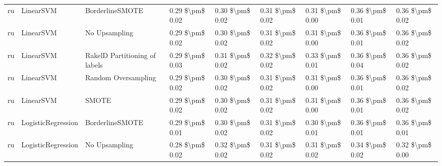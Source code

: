 \begin{tabular}{lllllllll}
      ru &                       LinearSVM &               BorderlineSMOTE & 0.29 \$\textbackslash pm\$ 0.02 &           0.30 \$\textbackslash pm\$ 0.02 &       0.31 \$\textbackslash pm\$ 0.02 &        0.31 \$\textbackslash pm\$ 0.00 &                         0.36 \$\textbackslash pm\$ 0.01 &     0.36 \$\textbackslash pm\$ 0.02 \\
      ru &                       LinearSVM &                 No Upsampling & 0.29 \$\textbackslash pm\$ 0.02 &           0.30 \$\textbackslash pm\$ 0.02 &       0.31 \$\textbackslash pm\$ 0.02 &        0.31 \$\textbackslash pm\$ 0.00 &                         0.36 \$\textbackslash pm\$ 0.01 &     0.36 \$\textbackslash pm\$ 0.02 \\
      ru &                       LinearSVM & RakelD Partitioning of labels & 0.29 \$\textbackslash pm\$ 0.03 &           0.31 \$\textbackslash pm\$ 0.02 &       0.32 \$\textbackslash pm\$ 0.02 &        0.33 \$\textbackslash pm\$ 0.01 &                         0.36 \$\textbackslash pm\$ 0.04 &     0.36 \$\textbackslash pm\$ 0.02 \\
      ru &                       LinearSVM &           Random Oversampling & 0.29 \$\textbackslash pm\$ 0.02 &           0.30 \$\textbackslash pm\$ 0.02 &       0.31 \$\textbackslash pm\$ 0.02 &        0.31 \$\textbackslash pm\$ 0.00 &                         0.36 \$\textbackslash pm\$ 0.01 &     0.36 \$\textbackslash pm\$ 0.02 \\
      ru &                       LinearSVM &                         SMOTE & 0.29 \$\textbackslash pm\$ 0.02 &           0.30 \$\textbackslash pm\$ 0.02 &       0.31 \$\textbackslash pm\$ 0.02 &        0.31 \$\textbackslash pm\$ 0.00 &                         0.36 \$\textbackslash pm\$ 0.01 &     0.36 \$\textbackslash pm\$ 0.02 \\
      ru &              LogisticRegression &               BorderlineSMOTE & 0.29 \$\textbackslash pm\$ 0.01 &           0.30 \$\textbackslash pm\$ 0.02 &       0.31 \$\textbackslash pm\$ 0.02 &        0.30 \$\textbackslash pm\$ 0.01 &                         0.36 \$\textbackslash pm\$ 0.01 &     0.36 \$\textbackslash pm\$ 0.01 \\
      ru &              LogisticRegression &                 No Upsampling & 0.28 \$\textbackslash pm\$ 0.02 &           0.32 \$\textbackslash pm\$ 0.02 &       0.31 \$\textbackslash pm\$ 0.02 &        0.31 \$\textbackslash pm\$ 0.02 &                         0.34 \$\textbackslash pm\$ 0.02 &     0.32 \$\textbackslash pm\$ 0.00 \\

\end{tabular}
